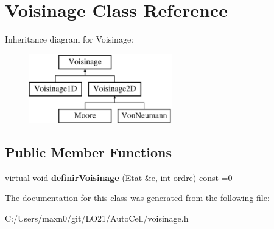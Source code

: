\hypertarget{class_voisinage}{}\section{Voisinage Class Reference}
\label{class_voisinage}
Inheritance diagram for Voisinage\+:\begin{figure}[H]
\begin{center}
\leavevmode
\includegraphics[height=3.000000cm]{class_voisinage}
\end{center}
\end{figure}
\subsection*{Public Member Functions}
\begin{DoxyCompactItemize}
\item 
\mbox{\label{class_voisinage_a58416a610f5800ed165b0a68e9a78689}} 
virtual void {\bfseries definir\+Voisinage} (\mbox{\hyperlink{class_etat}{Etat}} \&e, int ordre) const =0
\end{DoxyCompactItemize}


The documentation for this class was generated from the following file\+:\begin{DoxyCompactItemize}
\item 
C\+:/\+Users/maxn0/git/\+L\+O21/\+Auto\+Cell/voisinage.\+h\end{DoxyCompactItemize}
